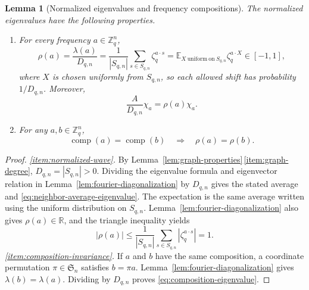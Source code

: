 \documentclass[11pt,a4paper]{article}
\numberwithin{equation}{section}
\numberwithin{figure}{section}
\numberwithin{table}{section}
\numberwithin{footnote}{section}
\newtheorem{lemma}[theorem]{Lemma}
\theoremstyle{informal}\newtheorem*{informaltheorem}{Informal theorem}
\theoremstyle{definition}\newtheorem{example}{Example}[section]
\theoremstyle{remark}\newtheorem{remark}[theorem]{Remark}
\newcommand{\Z}{\mathbb Z}
\newcommand{\E}{\mathbb E}
\begin{document}
\begin{lemma}[Normalized eigenvalues and frequency compositions]
\label{lem:normalized-compositions}
The normalized eigenvalues have the following properties.
\begin{enumerate}[label=\textup{(\roman*)},leftmargin=*,itemsep=4pt]
\item\label{item:normalized-wave}
For every frequency \(a\in\Z_q^n\),
\begin{equation}\label{eq:normalized-eigenvalue}
 \rho(a)=\frac{\lambda(a)}{D_{q,n}}
 =\frac1{|S_{q,n}|}\sum_{s\in S_{q,n}}\zeta_q^{a\cdot s}
 =\E_{X\ \mathrm{uniform\ on}\ S_{q,n}}\zeta_q^{a\cdot X}
 \in[-1,1],
\end{equation}
where \(X\) is chosen uniformly from \(S_{q,n}\), so each
allowed shift has probability \(1/D_{q,n}\). Moreover,
\begin{equation}\label{eq:neighbor-average-eigenvalue}
 \frac{A}{D_{q,n}}\chi_a=\rho(a)\chi_a.
\end{equation}
\item\label{item:composition-invariance}
For any \(a,b\in\Z_q^n\),
\begin{equation}\label{eq:composition-eigenvalue}
 \operatorname{comp}(a)=\operatorname{comp}(b)
 \quad\Longrightarrow\quad \rho(a)=\rho(b).
\end{equation}
\end{enumerate}
\end{lemma}
\begin{proof}
\emph{\ref{item:normalized-wave}.}
By Lemma~\ref{lem:graph-properties}\,\ref{item:graph-degree},
\(D_{q,n}=|S_{q,n}|>0\). Dividing the eigenvalue formula and
eigenvector relation in Lemma~\ref{lem:fourier-diagonalization}
by \(D_{q,n}\) gives the stated average and
\eqref{eq:neighbor-average-eigenvalue}. The expectation is the
same average written using the uniform distribution on \(S_{q,n}\).
Lemma~\ref{lem:fourier-diagonalization} also gives
\(\rho(a)\in\mathbb R\), and the triangle inequality yields
\begin{equation}
 |\rho(a)|\leq\frac1{|S_{q,n}|}
              \sum_{s\in S_{q,n}}|\zeta_q^{a\cdot s}|=1.
\end{equation}
\emph{\ref{item:composition-invariance}.}
If \(a\) and \(b\) have the same composition, a coordinate
permutation \(\pi\in\mathfrak S_n\) satisfies \(b=\pi a\).
Lemma~\ref{lem:fourier-diagonalization} gives
\(\lambda(b)=\lambda(a)\). Dividing by \(D_{q,n}\) proves
\eqref{eq:composition-eigenvalue}.
\end{proof}
\end{document}
